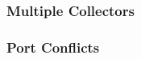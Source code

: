 % 
%
% 
% 

\subsubsection{\label{sec:Ports-MultipleCollectors}Multiple Collectors}
\Todo


\subsubsection{\label{sec:Ports-Conflicts}Port Conflicts}
\Todo

